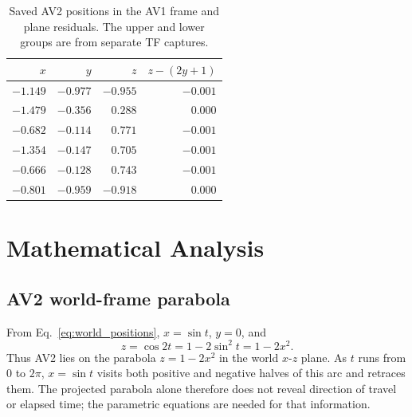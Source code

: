 \documentclass[letterpaper,10pt,conference]{ieeeconf}
\begin{document}
\begin{table}[t]
\caption{Saved AV2 positions in the AV1 frame and plane residuals. The upper and lower groups are from separate TF captures.}
\label{tab:plane_check}
\centering
\small
\begin{tabular}{rrrr}
\toprule
$x$ & $y$ & $z$ & $z-(2y+1)$ \\
\midrule
$-1.149$ & $-0.977$ & $-0.955$ & $-0.001$ \\
$-1.479$ & $-0.356$ & $ 0.288$ & $ 0.000$ \\
$-0.682$ & $-0.114$ & $ 0.771$ & $-0.001$ \\
\midrule
$-1.354$ & $-0.147$ & $ 0.705$ & $-0.001$ \\
$-0.666$ & $-0.128$ & $ 0.743$ & $-0.001$ \\
$-0.801$ & $-0.959$ & $-0.918$ & $ 0.000$ \\
\bottomrule
\end{tabular}
\end{table}

\section{Mathematical Analysis}
\label{sec:math}

\subsection{AV2 world-frame parabola}
From Eq.~\eqref{eq:world_positions}, $x=\sin t$, $y=0$, and
\begin{equation}
z=\cos 2t=1-2\sin^{2}t=1-2x^{2}.
\end{equation}
Thus AV2 lies on the parabola $z=1-2x^{2}$ in the world $x$-$z$ plane.
As $t$ runs from $0$ to $2\pi$, $x=\sin t$ visits both positive and negative halves of this arc and retraces them. The projected parabola alone therefore does not reveal direction of travel or elapsed time; the parametric equations are needed for that information.
\end{document}
